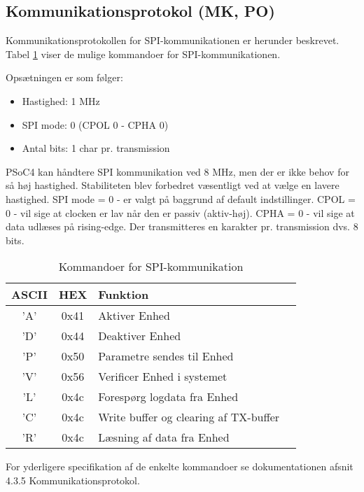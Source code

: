 \subsection{Kommunikationsprotokol (MK, PO)}\label{head:kommunikationsprotokol}
Kommunikationsprotokollen for SPI-kommunikationen er herunder beskrevet. Tabel \ref{tabel:SWProtokol-kommandoer} viser de mulige kommandoer for SPI-kommunikationen. 

Opsætningen er som følger:

\begin{itemize}
  \item Hastighed: 1 MHz
  \item SPI mode: 0 (CPOL 0 - CPHA 0)
  \item Antal bits: 1 char pr. transmission
\end{itemize}

PSoC4 kan håndtere SPI kommunikation ved 8 MHz, men der er ikke behov for så høj hastighed. Stabiliteten blev forbedret væsentligt ved at vælge en lavere hastighed. 
\newline SPI mode = 0 - er valgt på baggrund af default indstillinger. 
\newline CPOL = 0 - vil sige at clocken er lav når den er passiv (aktiv-høj). 
\newline CPHA = 0 - vil sige at data udlæses på rising-edge. 
\newline Der transmitteres en karakter pr. transmission dvs. 8 bits.

\begin{table}[H]
\caption{Kommandoer for SPI-kommunikation}
\centering
\begin{tabular}{|c|c|l|c|}
\hline 
\textbf{ASCII} & \textbf{HEX} & \textbf{Funktion} \\ 
\hline 
'A' & 0x41 & Aktiver Enhed \\ 
\hline 
'D' & 0x44 & Deaktiver Enhed \\ 
\hline 
'P' & 0x50 & Parametre sendes til Enhed \\
\hline 
'V' & 0x56 & Verificer Enhed i systemet \\ 
\hline
'L' & 0x4c & Forespørg logdata fra Enhed \\ 
\hline
'C' & 0x4c & Write buffer og clearing af TX-buffer  \\
\hline
'R' & 0x4c & Læsning af data fra Enhed \\
\hline
\end{tabular}
\label{tabel:SWProtokol-kommandoer}
\end{table} 


For yderligere specifikation af de enkelte kommandoer se dokumentationen afsnit 4.3.5 Kommunikationsprotokol.